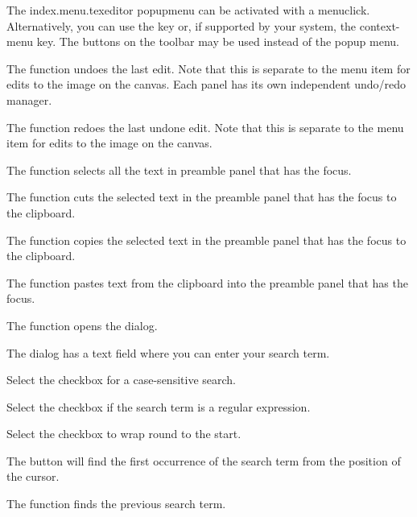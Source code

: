 
The \gls{index.menu.texeditor} \gls*{popupmenu} can be activated with a \gls{menuclick}.
Alternatively, you can use the  key or, if supported by your
system, the  \gls{context-menu} key.
The buttons on the toolbar may be used instead of the popup menu.

%
The  function undoes the last edit. Note that
this is separate to the  menu item for edits to the
image on the \gls{canvas}. Each panel has its own independent
undo\slash redo manager.

%
The  function redoes the last undone edit. Note that
this is separate to the  menu item for edits to the
image on the \gls{canvas}.

%
The  function selects all the text in
preamble panel that has the focus.

%
The  function cuts the selected text in the
preamble panel that has the focus to the clipboard.

%
The  function copies the selected text in the
preamble panel that has the focus to the clipboard.

%
The  function pastes text from the
clipboard into the preamble panel that has the focus.

%
The  function opens the 
dialog.

%
The  dialog has a text field where you can enter your
search term. 

%
Select the  checkbox for a case-sensitive search.

%
Select the  checkbox if the search term is a
regular expression.

%
Select the  checkbox to wrap round to the start.

%
The  button will find the first occurrence of the
search term from the position of the cursor.

%
The  function finds the previous
search term.

